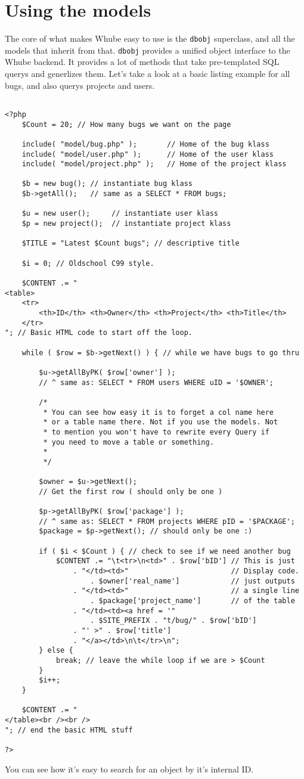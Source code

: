 \section{Using the models}
The core of what makes Whube easy to use is the \texttt{dbobj} superclass, and all the
models that inherit from that. \texttt{dbobj} provides a unified object interface to the
Whube backend. It provides a lot of methods that take pre-templated SQL querys and generlizes them.
Let's take a look at a basic listing example for all bugs, and also querys projects and users.
\begin{verbatim}

<?php
    $Count = 20; // How many bugs we want on the page

    include( "model/bug.php" );       // Home of the bug klass
    include( "model/user.php" );      // Home of the user klass
    include( "model/project.php" );   // Home of the project klass

    $b = new bug(); // instantiate bug klass
    $b->getAll();   // same as a SELECT * FROM bugs;

    $u = new user();     // instantiate user klass
    $p = new project();  // instantiate project klass

    $TITLE = "Latest $Count bugs"; // descriptive title

    $i = 0; // Oldschool C99 style.

    $CONTENT .= "
<table>
    <tr>
        <th>ID</th> <th>Owner</th> <th>Project</th> <th>Title</th>
    </tr>
"; // Basic HTML code to start off the loop.

    while ( $row = $b->getNext() ) { // while we have bugs to go thru

        $u->getAllByPK( $row['owner'] );
        // ^ same as: SELECT * FROM users WHERE uID = '$OWNER';

        /*
         * You can see how easy it is to forget a col name here
         * or a table name there. Not if you use the models. Not
         * to mention you won't have to rewrite every Query if
         * you need to move a table or something.
         *
         */

        $owner = $u->getNext();
        // Get the first row ( should only be one ) 

        $p->getAllByPK( $row['package'] );
        // ^ same as: SELECT * FROM projects WHERE pID = '$PACKAGE';
        $package = $p->getNext(); // should only be one :)

        if ( $i < $Count ) { // check to see if we need another bug
            $CONTENT .= "\t<tr>\n<td>" . $row['bID'] // This is just
                . "</td><td>"                        // Display code.
                    . $owner['real_name']            // just outputs
                . "</td><td>"                        // a single line
                    . $package['project_name']       // of the table
                . "</td><td><a href = '"
                    . $SITE_PREFIX . "t/bug/" . $row['bID']
                . "' >" . $row['title']
                . "</a></td>\n\t</tr>\n";
        } else {
            break; // leave the while loop if we are > $Count
        }
        $i++;
    }

    $CONTENT .= "
</table><br /><br />
"; // end the basic HTML stuff

?>
\end{verbatim}
You can see how it's easy to search for an object by it's internal ID.
